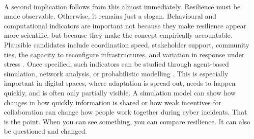 \\
A second implication follows from this almost immediately. Resilience must be made observable. Otherwise, it remains just a slogan. Behavioural and computational indicators are important not because they make resilience appear more scientific, but because they make the concept empirically accountable. Plausible candidates include coordination speed, stakeholder support, community ties, the capacity to reconfigure infrastructures, and variation in response under stress \autocite{mayer2021putting,hollnagel2013resilience,gillard2023efficient}. Once specified, such indicators can be studied through agent-based simulation, network analysis, or probabilistic modelling \autocite{helbing2012agent}. This is especially important in digital spaces, where adaptation is spread out, needs to happen quickly, and is often only partially visible. A simulation model can show how changes in how quickly information is shared or how weak incentives for collaboration can change how people work together during cyber incidents. That is the point. When you can see something, you can compare resilience. It can also be questioned and changed.\\

